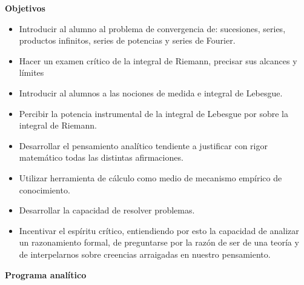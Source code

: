 \documentclass[12pt]{article}
\begin{document}
\textbf{Objetivos}
\begin{itemize}
 \item Introducir al alumno al problema de convergencia de: sucesiones, series, productos infinitos, series de potencias y series de Fourier.
 \item Hacer un examen crítico de la integral de Riemann, precisar sus alcances y límites
 \item Introducir al alumnos a las nociones de medida e integral de Lebesgue. 
 \item Percibir la potencia instrumental de la integral de Lebesgue por sobre la integral de Riemann.
 \item Desarrollar el pensamiento analítico tendiente a justificar con rigor matemático todas las distintas afirmaciones.
 \item Utilizar herramienta de cálculo como medio de mecanismo empírico de conocimiento.
 \item Desarrollar la capacidad de resolver problemas.
 \item Incentivar el espíritu crítico, entiendiendo por esto la capacidad  de analizar un razonamiento formal, de preguntarse por la razón de ser de una teoría y de interpelarnos sobre creencias arraigadas en nuestro pensamiento. 
\end{itemize}

\newpage








\begin{center}
 {\Large \bfseries Programa analítico} 
\end{center}
\end{document}
